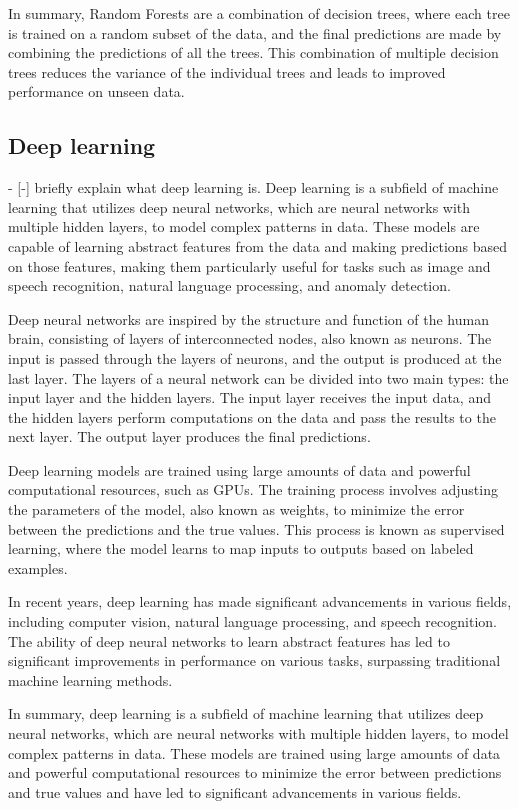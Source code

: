 In summary, Random Forests are a combination of decision trees, where each tree is trained on a random subset of the data, and the final predictions are made by combining the predictions of all the trees. This combination of multiple decision trees reduces the variance of the individual trees and leads to improved performance on unseen data.



\subsection{Deep learning}
- [-] briefly explain what deep learning is.
Deep learning is a subfield of machine learning that utilizes deep neural networks, which are neural networks with multiple hidden layers, to model complex patterns in data. These models are capable of learning abstract features from the data and making predictions based on those features, making them particularly useful for tasks such as image and speech recognition, natural language processing, and anomaly detection.

Deep neural networks are inspired by the structure and function of the human brain, consisting of layers of interconnected nodes, also known as neurons. The input is passed through the layers of neurons, and the output is produced at the last layer. The layers of a neural network can be divided into two main types: the input layer and the hidden layers. The input layer receives the input data, and the hidden layers perform computations on the data and pass the results to the next layer. The output layer produces the final predictions.

Deep learning models are trained using large amounts of data and powerful computational resources, such as GPUs. The training process involves adjusting the parameters of the model, also known as weights, to minimize the error between the predictions and the true values. This process is known as supervised learning, where the model learns to map inputs to outputs based on labeled examples.

In recent years, deep learning has made significant advancements in various fields, including computer vision, natural language processing, and speech recognition. The ability of deep neural networks to learn abstract features has led to significant improvements in performance on various tasks, surpassing traditional machine learning methods.

In summary, deep learning is a subfield of machine learning that utilizes deep neural networks, which are neural networks with multiple hidden layers, to model complex patterns in data. These models are trained using large amounts of data and powerful computational resources to minimize the error between predictions and true values and have led to significant advancements in various fields.

